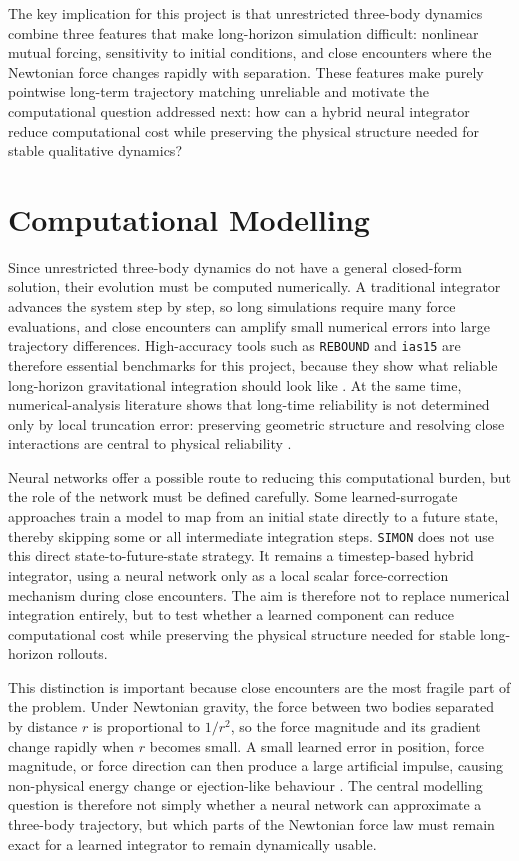\documentclass[12pt]{article}
\begin{document}
The key implication for this project is that unrestricted three-body dynamics combine three
features that make long-horizon simulation difficult: nonlinear mutual forcing, sensitivity
to initial conditions, and close encounters where the Newtonian force changes rapidly with
separation. These features make purely pointwise long-term trajectory matching unreliable
and motivate the computational question addressed next: how can a hybrid neural integrator
reduce computational cost while preserving the physical structure needed for stable qualitative dynamics?
\section{Computational Modelling}
\label{sec:comp_modeling}

Since unrestricted three-body dynamics do not have a general closed-form solution,
their evolution must be computed numerically. A traditional integrator advances the
system step by step, so long simulations require many force evaluations, and close
encounters can amplify small numerical errors into large trajectory differences. High-accuracy
tools such as \texttt{REBOUND} and \texttt{ias15} are therefore essential benchmarks for
this project, because they show what reliable long-horizon gravitational integration
should look like \cite{Rein2012,Rein_2014}. At the same time, numerical-analysis
literature shows that long-time reliability is not determined only by local truncation
error: preserving geometric structure and resolving close interactions are central to
physical reliability \cite{hairer2006geometric,boekholt2015reliability}.

Neural networks offer a possible route to reducing this computational burden, but the
role of the network must be defined carefully. Some learned-surrogate approaches train
a model to map from an initial state directly to a future state, thereby skipping some
or all intermediate integration steps. \texttt{SIMON} does not use this direct
state-to-future-state strategy. It remains a timestep-based hybrid integrator, using
a neural network only as a local scalar force-correction mechanism during close
encounters. The aim is therefore not to replace numerical integration entirely, but to
test whether a learned component can reduce computational cost while preserving the
physical structure needed for stable long-horizon rollouts.

This distinction is important because close encounters are the most fragile part of the
problem. Under Newtonian gravity, the force between two bodies separated by distance
$r$ is proportional to $1/r^2$, so the force magnitude and its gradient change rapidly
when $r$ becomes small. A small learned error in position, force magnitude, or force
direction can then produce a large artificial impulse, causing non-physical energy
change or ejection-like behaviour \cite{Dehnen2001}. The central modelling question is
therefore not simply whether a neural network can approximate a three-body trajectory,
but which parts of the Newtonian force law must remain exact for a learned integrator
to remain dynamically usable.
\end{document}
